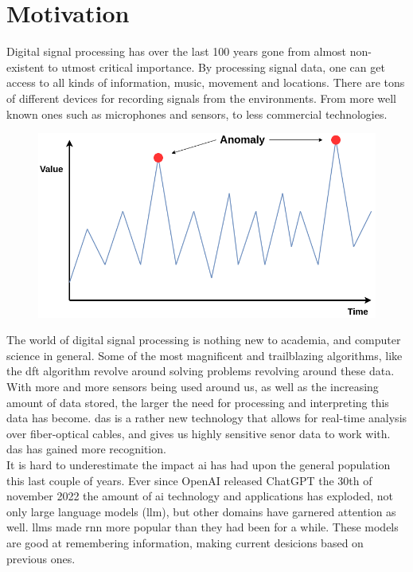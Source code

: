 \section{Motivation}

Digital signal processing has over the last 100 years gone from almost non-existent to utmost critical importance. By processing signal data, one can get access to all kinds of information, music, movement and locations. There are tons of different devices for recording signals from the environments. From more well known ones such as microphones and sensors, to less commercial technologies. \\

\begin{figure}[ht]
    \centering
    \includegraphics[scale=0.4]{figures/anolay_line.png}
    \label{fig:anomaly_example}
\end{figure}

The world of digital signal processing is nothing new to academia, and computer science in general. Some of the most magnificent and trailblazing algorithms, like the \acrfull{dft} algorithm revolve around solving problems revolving around these data. With more and more sensors being used around us, as well as the increasing amount of data stored, the larger the need for processing and interpreting this data has become. 
\acrfull{das} is a rather new technology that allows for real-time analysis over fiber-optical cables, and gives us highly sensitive senor data to work with. \acrshort{das} has gained more recognition. \\

It is hard to underestimate the impact \acrshort{ai} has had upon the general population this last couple of years. Ever since OpenAI released ChatGPT the 30th of november 2022 \cite{chatgpt} the amount of \acrshort{ai} technology and applications has exploded, not only large language models (\acrshort{llm}), but other domains have garnered attention as well. \acrshort{llm}s made \acrfull{rnn} more popular than they had been for a while. These models are good at remembering information, making current desicions based on previous ones. \\ 

